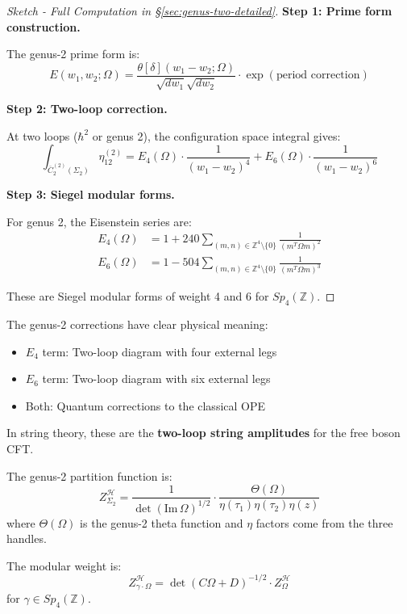 \begin{proof}[Sketch - Full Computation in §\ref{sec:genus-two-detailed}]

\textbf{Step 1: Prime form construction.}

The genus-2 prime form is:
$$E(w_1, w_2; \Omega) = \frac{\theta[\delta](w_1 - w_2; \Omega)}
{\sqrt{dw_1}\sqrt{dw_2}} \cdot \exp(\text{period correction})$$

\textbf{Step 2: Two-loop correction.}

At two loops ($\hbar^2$ or genus 2), the configuration space integral gives:
$$\int_{\overline{C}_2^{(2)}(\Sigma_2)} \eta_{12}^{(2)} = E_4(\Omega) 
\cdot \frac{1}{(w_1-w_2)^4} + E_6(\Omega) \cdot \frac{1}{(w_1-w_2)^6}$$

\textbf{Step 3: Siegel modular forms.}

For genus 2, the Eisenstein series are:
\begin{align}
E_4(\Omega) &= 1 + 240\sum_{(m,n) \in \mathbb{Z}^4 \setminus \{0\}} 
\frac{1}{(m^T \Omega m)^2} \\
E_6(\Omega) &= 1 - 504\sum_{(m,n) \in \mathbb{Z}^4 \setminus \{0\}} 
\frac{1}{(m^T \Omega m)^3}
\end{align}

These are Siegel modular forms of weight 4 and 6 for $Sp_4(\mathbb{Z})$.
\end{proof}

\begin{remark}\label{rem:genus-two-physical}
The genus-2 corrections have clear physical meaning:
\begin{itemize}
\item $E_4$ term: Two-loop diagram with four external legs
\item $E_6$ term: Two-loop diagram with six external legs
\item Both: Quantum corrections to the classical OPE
\end{itemize}

In string theory, these are the \textbf{two-loop string amplitudes} for the 
free boson CFT.
\end{remark}

\begin{computation}\label{comp:partition-genus-two}
The genus-2 partition function is:
\begin{equation}
Z_{\Sigma_2}^{\mathcal{H}} = \frac{1}{\det(\text{Im}\,\Omega)^{1/2}} 
\cdot \frac{\Theta(\Omega)}{\eta(\tau_1) \eta(\tau_2) \eta(z)}
\end{equation}
where $\Theta(\Omega)$ is the genus-2 theta function and $\eta$ factors come from 
the three handles.

The modular weight is:
$$Z_{\gamma \cdot \Omega}^{\mathcal{H}} = \det(C\Omega + D)^{-1/2} 
\cdot Z_{\Omega}^{\mathcal{H}}$$
for $\gamma \in Sp_4(\mathbb{Z})$.
\end{computation}

